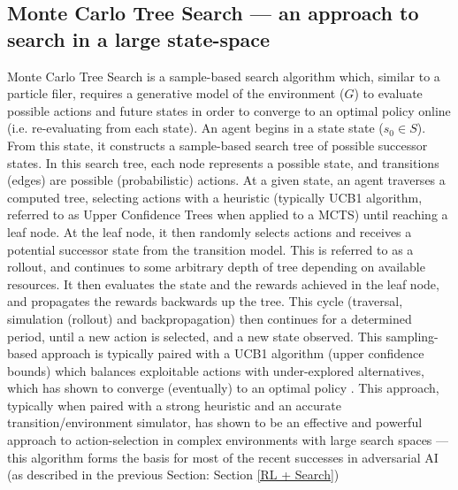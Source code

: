 \subsection{Monte Carlo Tree Search --- an approach to search in a large state-space}
Monte Carlo Tree Search is a sample-based search algorithm which, similar to a particle filer, requires a generative model of the environment ($G$) to evaluate possible actions and future states in order to converge to an optimal policy online (i.e. re-evaluating from each state). 
\newline \newline
An agent begins in a state state ($s_0 \in S$). From this state, it constructs a sample-based search tree of possible successor states. In this search tree, each node represents a possible state, and transitions (edges) are possible (probabilistic) actions. \newline \newline 
At a given state, an agent traverses a computed tree, selecting actions with a heuristic (typically UCB1 algorithm, referred to as Upper Confidence Trees when applied to a MCTS) until reaching a leaf node. At the leaf node, it then randomly selects actions and receives a potential successor state from the transition model. This is referred to as a rollout, and continues to some arbitrary depth of tree depending on available resources. It then evaluates the state and the rewards achieved in the leaf node, and propagates the rewards backwards up the tree. This cycle  (traversal, simulation (rollout) and backpropagation) then continues for a determined period, until a new action is selected, and a new state observed. 
\newline \newline
This sampling-based approach is typically paired with a UCB1 algorithm (upper confidence bounds) which balances exploitable actions with under-explored alternatives, which has shown to converge (eventually) to an optimal policy \cite{Ross2011}. 
\newline \newline
This approach, typically when paired with a strong heuristic and an accurate transition/environment simulator, has shown to be an effective and powerful approach to action-selection in complex environments with large search spaces --- this algorithm forms the basis for most of the recent successes in adversarial AI (as described in the previous Section: Section \ref{RL + Search}) 


